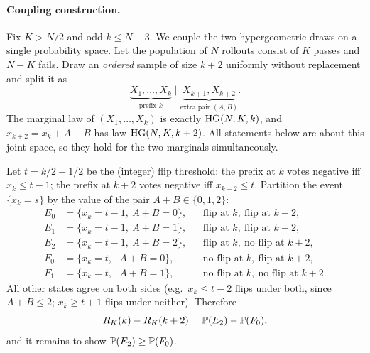 \paragraph{Coupling construction.}
Fix $K>N/2$ and odd $k\le N-3$. We couple the two hypergeometric draws on a
single probability space. Let the population of $N$ rollouts consist of $K$
passes and $N-K$ fails. Draw an \emph{ordered} sample of size $k+2$ uniformly
without replacement and split it as
\[
\underbrace{X_1,\dots,X_k}_{\text{prefix }k}\;\Big|\;
\underbrace{X_{k+1},X_{k+2}}_{\text{extra pair }(A,B)} .
\]
The marginal law of $(X_1,\dots,X_k)$ is exactly $\HG(N,K,k)$, and
$x_{k+2}=x_k+A+B$ has law $\HG(N,K,k+2)$. All statements below are about this
joint space, so they hold for the two marginals simultaneously.

Let $t=k/2+1/2$ be the (integer) flip threshold: the prefix at $k$ votes
negative iff $x_k\le t-1$; the prefix at $k+2$ votes negative iff
$x_{k+2}\le t$. Partition the event $\{x_k=s\}$ by the value of the pair
$A+B\in\{0,1,2\}$:
\[
\begin{aligned}
E_0&=\{x_k=t-1,\ A+B=0\}, &&\text{flip at }k,\ \text{flip at }k+2,\\
E_1&=\{x_k=t-1,\ A+B=1\}, &&\text{flip at }k,\ \text{flip at }k+2,\\
E_2&=\{x_k=t-1,\ A+B=2\}, &&\text{flip at }k,\ \text{no flip at }k+2,\\
F_0&=\{x_k=t,\ \ \ A+B=0\}, &&\text{no flip at }k,\ \text{flip at }k+2,\\
F_1&=\{x_k=t,\ \ \ A+B=1\}, &&\text{no flip at }k,\ \text{no flip at }k+2.
\end{aligned}
\]
All other states agree on both sides (e.g.\ $x_k\le t-2$ flips under both, since
$A+B\le2$; $x_k\ge t+1$ flips under neither). Therefore
\begin{equation}
\label{eq:rdiff}
R_K(k)-R_K(k+2)=\P(E_2)-\P(F_0),
\end{equation}
and it remains to show $\P(E_2)\ge\P(F_0)$.

